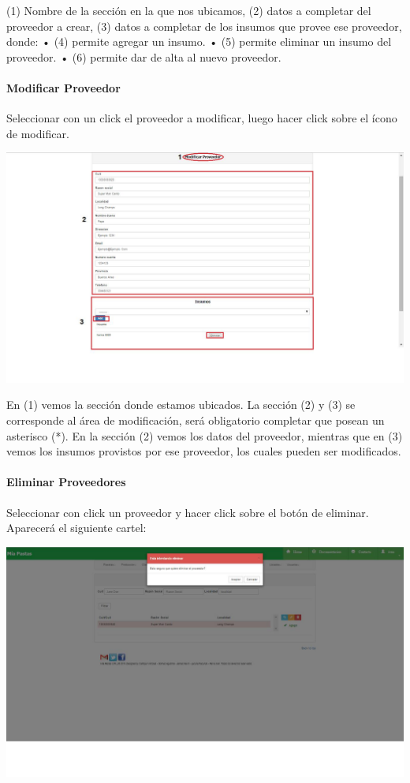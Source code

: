 \documentclass[letterpaper,10pt,english]{sphinxmanual}
\begin{document}
(1) Nombre de la sección en la que nos ubicamos, (2) datos a completar del proveedor a crear, (3) datos a completar de los insumos que provee ese proveedor, donde:
•       (4) permite agregar un insumo.
•       (5) permite eliminar un insumo del proveedor.
•       (6) permite dar de alta al nuevo proveedor.


\paragraph{{}Modificar Proveedor}
\label{proveedores consultarModifica:modificar-proveedor}\label{proveedores consultarModifica::doc}
Seleccionar con un click el proveedor a modificar, luego hacer click sobre el ícono de modificar.

\includegraphics{proveedor_modificar.jpg}

En (1) vemos la sección donde estamos ubicados. La sección (2) y (3) se corresponde al área de modificación, será obligatorio completar que posean un asterisco (*).  En la sección (2) vemos los datos del proveedor, mientras que en (3) vemos los insumos provistos por ese proveedor, los cuales pueden ser modificados.


\paragraph{{}Eliminar Proveedores}
\label{proveedores eliminar:eliminar-proveedores}\label{proveedores eliminar::doc}
Seleccionar con click un proveedor y hacer click sobre el botón de eliminar. Aparecerá el siguiente cartel:

\includegraphics{proveedor_eliminar.jpg}
\end{document}
